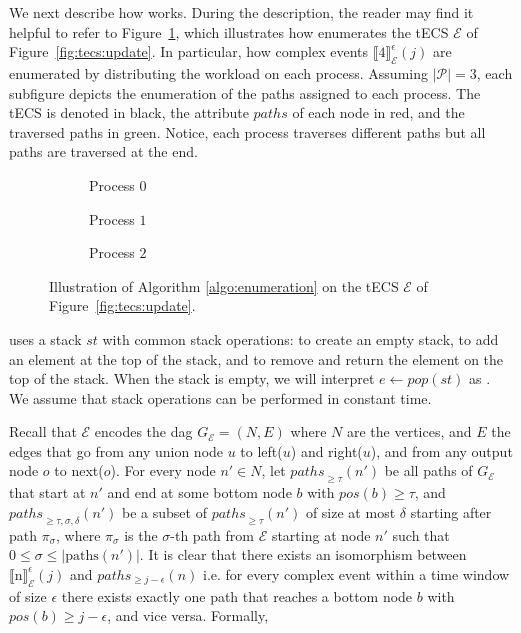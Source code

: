 We next describe how  works. During the description, the reader may find it helpful to refer to Figure~\ref{fig:tecs:enumeration}, which illustrates how  enumerates the tECS $\mathcal{E}$ of Figure~\ref{fig:tecs:update}. In particular, how complex events ${\llbracket \text{4} \rrbracket}^{\epsilon}_{\mathcal{E}}(j)$ are enumerated by distributing the workload on each process. Assuming $|\mathcal{P}| = 3$, each subfigure depicts the enumeration of the paths assigned to each process. The tECS is denoted in black, the attribute $paths$ of each node in red, and the traversed paths in green. Notice, each process traverses different paths but all paths are traversed at the end.

\begin{figure}[h]
  \centering
  \begin{subfigure}[b]{0.3\linewidth}
    \centering
    \caption{Process $0$}
  \end{subfigure}
  \hfill
  \begin{subfigure}[b]{0.3\linewidth}
    \centering
    \caption{Process $1$}
  \end{subfigure}
  \hfill
  \begin{subfigure}[b]{0.3\linewidth}
    \centering
    \caption{Process $2$}
  \end{subfigure}

  \caption{Illustration of Algorithm \ref{algo:enumeration} on the tECS $\mathcal{E}$ of Figure~\ref{fig:tecs:update}.}
  \label{fig:tecs:enumeration}
\end{figure}

 uses a stack $st$ with common stack operations:  to create an empty stack,  to add an element  at the top of the stack, and  to remove and return the element on the top of the stack. When the stack is empty, we will interpret $e \leftarrow pop(st)$ as . We assume that stack operations can be performed in constant time.

Recall that $\mathcal{E}$ encodes the \acrshort{dag} $G_{\mathcal{E}} = (N, E)$ where $N$ are the vertices, and $E$ the edges that go from any union node $u$ to left($u$) and right($u$), and from any output node $o$ to next($o$). For every node $n' \in N$, let ${paths}_{\ge \tau}(n')$ be all paths of $G_{\mathcal{E}}$ that start at $n'$ and end at some bottom node $b$ with $pos(b) \ge \tau$, and ${paths}_{\ge \tau, \sigma, \delta}(n')$ be a subset of ${paths}_{\ge \tau}(n')$ of size at most $\delta$ starting after path $\pi_{\sigma}$, where $\pi_{\sigma}$ is the $\sigma$-th path from $\mathcal{E}$ starting at node $n'$ such that $0 \le \sigma \le |\text{paths}(n')|$. It is clear that there exists an isomorphism between ${\llbracket \text{n} \rrbracket}^{\epsilon}_{\mathcal{E}}(j)$ and $paths_{\ge j - \epsilon}(n)$ i.e. for every complex event within a time window of size $\epsilon$ there exists exactly one path that reaches a bottom node $b$ with $pos(b) \ge j - \epsilon$, and vice versa. Formally,

